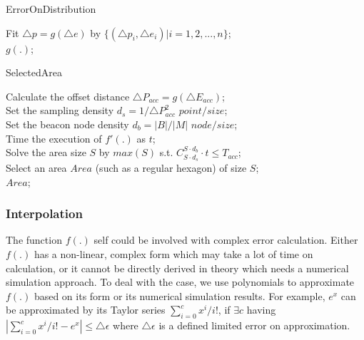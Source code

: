 \documentclass[10pt, conference, letterpaper]{IEEEtran}
\begin{document}
\begin{algorithm} \label{ErrorOnDistribution}
\caption{ErrorOnDistribution}
Fit $\triangle p = g(\triangle e)$ by $\{(\triangle p_i, \triangle e_i) | i=1,2,...,n\}$;\\
\Return $g(.)$;
\end{algorithm}

\begin{algorithm} \label{selectedArea}
\caption{SelectedArea}
Calculate the offset distance $\triangle P_{acc}=g(\triangle E_{acc})$;\\
Set the sampling density $d_s=1/\triangle P_{acc}^2$ $point/size$;\\
Set the beacon node density $d_b=|B|/|M|$ $node/size$;\\
Time the execution of $f'(.)$ as $t$;\\
Solve the area size $S$ by $max(S)$ s.t. $C_{S \cdot d_s}^{S \cdot d_b} \cdot t \leq T_{acc}$;\\
Select an area $Area$ (such as a regular hexagon) of size $S$;\\
\Return $Area$;
\end{algorithm}

\subsubsection{Interpolation} \label{interpolation}
The function $f(.)$ self could be involved with complex error calculation. Either $f(.)$ has a non-linear, complex form which may take a lot of time on calculation, or it cannot be directly derived in theory which needs a numerical simulation approach. To deal with the case, we use polynomials to approximate $f(.)$ based on its form or its numerical simulation results. For example, $e^x$ can be approximated by its Taylor series $\sum_{i=0}^c x^i/i!$, if $\exists c$ having $|\sum_{i=0}^c x^i/i!-e^x| \leq \triangle \epsilon$ where $\triangle \epsilon$ is a defined limited error on approximation.
\end{document}
